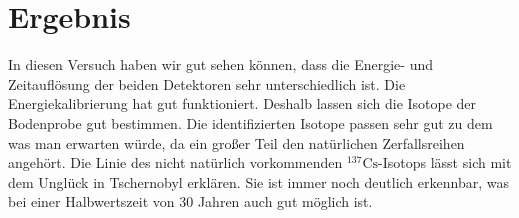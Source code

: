 \documentclass[11pt, ngerman, fleqn, DIV=15, headinclude, BCOR=2cm]{scrreprt}
\begin{document}
\chapter{Ergebnis}

In diesen Versuch haben wir gut sehen können, dass die Energie- und Zeitauflösung der
beiden Detektoren sehr unterschiedlich ist. Die Energiekalibrierung hat gut funktioniert. 
Deshalb lassen sich die Isotope der Bodenprobe gut bestimmen. Die identifizierten Isotope 
passen sehr gut zu dem was man erwarten würde, da ein großer Teil den
natürlichen Zerfallsreihen angehört. Die Linie des
nicht natürlich vorkommenden $^{137}\text{Cs}$-Isotops lässt sich mit dem
Unglück in Tschernobyl erklären. Sie ist immer noch deutlich erkennbar, was bei
einer Halbwertszeit von 30 Jahren auch gut möglich ist.

\end{document}
